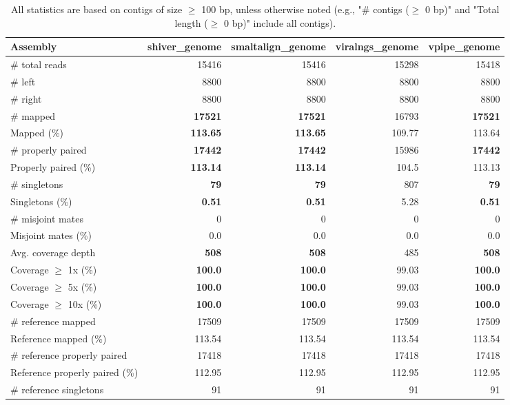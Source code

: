 \documentclass[12pt,a4paper]{article}
\begin{document}
\begin{table}[ht]
\begin{center}
\caption{All statistics are based on contigs of size $\geq$ 100 bp, unless otherwise noted (e.g., "\# contigs ($\geq$ 0 bp)" and "Total length ($\geq$ 0 bp)" include all contigs).}
\begin{tabular}{|l*{4}{|r}|}
\hline
Assembly & shiver\_genome & smaltalign\_genome & viralngs\_genome & vpipe\_genome \\ \hline
\# total reads & 15416 & 15416 & 15298 & 15418 \\ \hline
\# left & 8800 & 8800 & 8800 & 8800 \\ \hline
\# right & 8800 & 8800 & 8800 & 8800 \\ \hline
\# mapped & {\bf 17521} & {\bf 17521} & 16793 & {\bf 17521} \\ \hline
Mapped (\%) & {\bf 113.65} & {\bf 113.65} & 109.77 & 113.64 \\ \hline
\# properly paired & {\bf 17442} & {\bf 17442} & 15986 & {\bf 17442} \\ \hline
Properly paired (\%) & {\bf 113.14} & {\bf 113.14} & 104.5 & 113.13 \\ \hline
\# singletons & {\bf 79} & {\bf 79} & 807 & {\bf 79} \\ \hline
Singletons (\%) & {\bf 0.51} & {\bf 0.51} & 5.28 & {\bf 0.51} \\ \hline
\# misjoint mates & 0 & 0 & 0 & 0 \\ \hline
Misjoint mates (\%) & 0.0 & 0.0 & 0.0 & 0.0 \\ \hline
Avg. coverage depth & {\bf 508} & {\bf 508} & 485 & {\bf 508} \\ \hline
Coverage $\geq$ 1x (\%) & {\bf 100.0} & {\bf 100.0} & 99.03 & {\bf 100.0} \\ \hline
Coverage $\geq$ 5x (\%) & {\bf 100.0} & {\bf 100.0} & 99.03 & {\bf 100.0} \\ \hline
Coverage $\geq$ 10x (\%) & {\bf 100.0} & {\bf 100.0} & 99.03 & {\bf 100.0} \\ \hline
\# reference mapped & 17509 & 17509 & 17509 & 17509 \\ \hline
Reference mapped (\%) & 113.54 & 113.54 & 113.54 & 113.54 \\ \hline
\# reference properly paired & 17418 & 17418 & 17418 & 17418 \\ \hline
Reference properly paired (\%) & 112.95 & 112.95 & 112.95 & 112.95 \\ \hline
\# reference singletons & 91 & 91 & 91 & 91 \\ \hline

\end{tabular}
\end{center}
\end{table}
\end{document}
